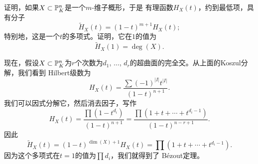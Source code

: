 \begin{exe}\label{exe:3.83}
	证明，如果$X\subset \P_K^n$是一个$m$-维子概形，于是
	有理函数$H_X(t)$，约到最低项，具有分子
	\[
		\tilde{H}_X(t)=(1-t)^{m+1}H_X(t);
	\]
	特别地，这是一个$t$的多项式。证明，它在$1$的值为
	\[
		\tilde{H}_X(1)=\deg(X).
	\]
\end{exe}

现在，假设$X\subset \P_K^n$为$r$个次数为$d_1$, $\dots$, 
$d_r$的超曲面的完全交。从上面的Koszul分解，我们看到
Hilbert级数为
\[
	H_X(t)=\frac{\sum (-1)^{|I|}t^{|I|}}{(1-t)^{n+1}}.
\]
我们可以因式分解它，然后消去因子，写作
\[
	H_X(t)=\frac{\prod (1-t^{d_i})}{(1-t)^{n+1}}
	=\frac{\prod (1+t+\cdots+t^{d_{i}-1})}{(1-t)^{n-r+1}}.
\]
因此
\[
	\tilde{H}_X(t)=(1-t)^{\dim(X)+1}H_X(t)=
	\prod (1+t+\cdots+t^{d_{i}-1}).
\]
因为这个多项式在$t=1$的值为$\prod d_i$，我们就得到了
B\'ezout定理。
